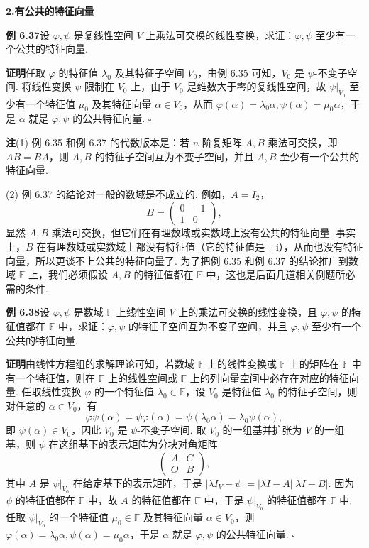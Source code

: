 \documentclass[UTF8, 12pt, fontset=fandol, oneside]{ctexart}
\begin{document}
\noindent\textbf{2.\quad 有公共的特征向量}

\noindent\textbf{例 6.37}\quad 设 $\varphi,\psi$ 是复线性空间 $V$ 上乘法可交换的线性变换，求证：$\varphi,\psi$ 至少有一个公共的特征向量.

\noindent\textbf{证明}\quad 任取 $\varphi$ 的特征值 $\lambda_0$ 及其特征子空间 $V_0$，由例 6.35 可知，$V_0$ 是 $\psi$-不变子空间. 将线性变换 $\psi$ 限制在 $V_0$ 上，由于 $V_0$ 是维数大于零的复线性空间，故 $\psi|_{V_0}$ 至少有一个特征值 $\mu_0$ 及其特征向量 $\alpha\in V_0$，从而 $\varphi(\alpha)=\lambda_0\alpha,\psi(\alpha)=\mu_0\alpha$，于是 $\alpha$ 就是 $\varphi,\psi$ 的公共特征向量. $\square$

\noindent\textbf{注}\quad (1) 例 6.35 和例 6.37 的代数版本是：若 $n$ 阶复矩阵 $A,B$ 乘法可交换，即 $AB=BA$，则 $A,B$ 的特征子空间互为不变子空间，并且 $A,B$ 至少有一个公共的特征向量.

(2) 例 6.37 的结论对一般的数域是不成立的. 例如，$A=I_2$，
\[
B=\left(\begin{array}{cc}
0 & -1\\
1 & 0
\end{array}\right),
\]
显然 $A,B$ 乘法可交换，但它们在有理数域或实数域上没有公共的特征向量. 事实上，$B$ 在有理数域或实数域上都没有特征值（它的特征值是 $\pm\mathrm{i}$），从而也没有特征向量，所以更谈不上公共的特征向量了. 为了把例 6.35 和例 6.37 的结论推广到数域 $\mathbb{F}$ 上，我们必须假设 $A,B$ 的特征值都在 $\mathbb{F}$ 中，这也是后面几道相关例题所必需的条件.

\noindent\textbf{例 6.38}\quad 设 $\varphi,\psi$ 是数域 $\mathbb{F}$ 上线性空间 $V$ 上的乘法可交换的线性变换，且 $\varphi,\psi$ 的特征值都在 $\mathbb{F}$ 中，求证：$\varphi,\psi$ 的特征子空间互为不变子空间，并且 $\varphi,\psi$ 至少有一个公共的特征向量.

\noindent\textbf{证明}\quad 由线性方程组的求解理论可知，若数域 $\mathbb{F}$ 上的线性变换或 $\mathbb{F}$ 上的矩阵在 $\mathbb{F}$ 中有一个特征值，则在 $\mathbb{F}$ 上的线性空间或 $\mathbb{F}$ 上的列向量空间中必存在对应的特征向量. 任取线性变换 $\varphi$ 的一个特征值 $\lambda_0\in\mathbb{F}$，设 $V_0$ 是特征值 $\lambda_0$ 的特征子空间，则对任意的 $\alpha\in V_0$，有
\[
\varphi\psi(\alpha)=\psi\varphi(\alpha)=\psi(\lambda_0\alpha)=\lambda_0\psi(\alpha),
\]
即 $\psi(\alpha)\in V_0$，因此 $V_0$ 是 $\psi$-不变子空间. 取 $V_0$ 的一组基并扩张为 $V$ 的一组基，则 $\psi$ 在这组基下的表示矩阵为分块对角矩阵
\[
\left(\begin{array}{cc}
A & C\\
O & B
\end{array}\right),
\]
其中 $A$ 是 $\psi|_{V_0}$ 在给定基下的表示矩阵，于是 $|\lambda I_V-\psi|=|\lambda I-A||\lambda I-B|$. 因为 $\psi$ 的特征值都在 $\mathbb{F}$ 中，故 $A$ 的特征值都在 $\mathbb{F}$ 中，于是 $\psi|_{V_0}$ 的特征值都在 $\mathbb{F}$ 中. 任取 $\psi|_{V_0}$ 的一个特征值 $\mu_0\in\mathbb{F}$ 及其特征向量 $\alpha\in V_0$，则 $\varphi(\alpha)=\lambda_0\alpha,\psi(\alpha)=\mu_0\alpha$，于是 $\alpha$ 就是 $\varphi,\psi$ 的公共特征向量. $\square$
\end{document}
